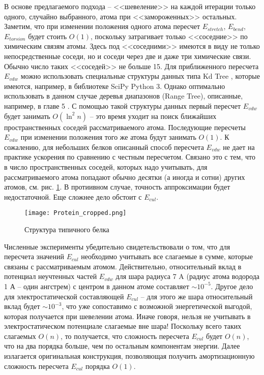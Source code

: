   В основе предлагаемого подхода -- <<шевеление>> на каждой итерации только 
  одного, случайно выбранного, атома при <<замороженных>> остальных. Заметим, 
  что при изменении положения одного атома пересчет $E_{stretch} $, $E_{bend} 
  $, $E_{torsion} $ будет стоить ${O}\left( 1 \right)$, поскольку 
  затрагивает только <<соседние>> по химическим связям атомы. Здесь под <<соседними>> 
  имеются в виду не только непосредственные соседи, но и соседи через две и даже три химические связи. Обычно число таких 
  <<соседей>> не больше 15. Для приближенного пересчета $E_{vdw} $ можно использовать 
  специальные структуры данных типа Kd Tree \cite{de2000computational}, которые имеются, например, в 
  библиотеке SciPy Python 3. Однако оптимально использовать в данном случае 
  деревья диапазонов (Range Tree), описанные, например, в главе 5 \cite{de2000computational}. С помощью такой структуры данных первый пересчет $E_{vdw} $ будет занимать 
  ${O}\left( {\ln ^2n} \right)$ -- это время уходит на поиск ближайших 
  пространственных соседей рассматриваемого атома. Последующие пересчеты 
  $E_{vdw} $ при изменении положения того же атома будут занимать ${
  O}\left( 1 \right)$. К сожалению, для небольших белков описанный способ пересчета $E_{vdw}$ не дает на практике ускорения по сравнению с честным пересчетом. Связано это с тем, что в число пространственных соседей, которых надо учитывать, для рассматриваемого атома попадают обычно десятки (а иногда и сотни) других атомов, см. рис. \ref{belok}. В протиивном случае, точность аппроксимации будет недостаточной. Еще сложнее дело обстоит с $E_{cul} $. 

  \begin{figure}
  \begin{center}
  \texttt{[image: Protein\_cropped.png]}
  \end{center}
  \caption{Структура типичного белка}
  \label{belok}
  \end{figure}
   
  Численные эксперименты убедительно свидетельствовали о том, что для пересчета значений $E_{cul} $ необходимо учитывать все слагаемые в сумме, которые связаны с рассматриваемым атомом. Действительно, относительный вклад в потенциал неучтенных частей $E_{vdw}$ для шара радиуса 7 A (радиус атома водорода 1 А -- один ангстрем) с центром в данном атоме составляет $\sim 10^{-5}$. Другое дело для электростатической составляющей $E_{cul}$ -- для этого же шара относительный вклад будет $\sim 10^{-3}$, что уже сопоставимо с возможной энергетической выгодой, которая получается при шевелении атома. Иначе говоря, нельзя не учитывать в электростатическом потенциале слагаемые вне шара! Поскольку всего таких слагаемых 
  ${O}\left( n \right)$, то получается, что сложность пересчета $E_{cul} $ будет ${
  O}\left( n \right)$, что на два порядка больше, чем по остальным 
  компонентам энергии. Далее излагается  оригинальная конструкция, позволяющая получить амортизационную сложность пересчета 
  $E_{cul} $ порядка ${O}\left( 1 \right)$. 

